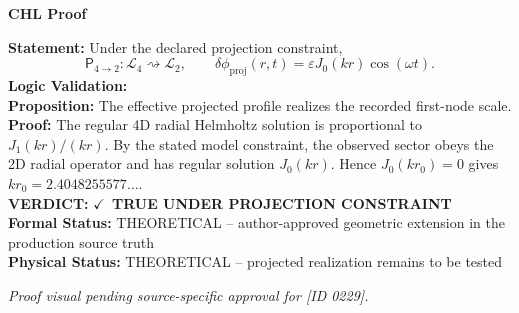 \vspace{0.45em}
\noindent\textbf{CHL Proof}\par
\textbf{Statement:} Under the declared projection constraint,
\[
\mathsf{P}_{4\to2}:\mathcal{L}_4\rightsquigarrow\mathcal{L}_2,\qquad \delta\phi_{\mathrm{proj}}(r,t)=\varepsilon J_0(k r)\cos(\omega t).
\]
\textbf{Logic Validation:}\\
\textbf{Proposition:} The effective projected profile realizes the recorded first-node scale.\\
\textbf{Proof:} The regular 4D radial Helmholtz solution is proportional to \(J_1(k r)/(k r)\). By the stated model constraint, the observed sector obeys the 2D radial operator and has regular solution \(J_0(k r)\). Hence \(J_0(k r_0)=0\) gives \(k r_0=2.4048255577\ldots\).\\
\textbf{VERDICT:} \ensuremath{\checkmark}\ \textbf{TRUE UNDER PROJECTION CONSTRAINT}\\
\textbf{Formal Status:} THEORETICAL -- author-approved geometric extension in the production source truth\\
\textbf{Physical Status:} THEORETICAL -- projected realization remains to be tested
\par\vspace{0.45em}
\par
\vfill
\begingroup\footnotesize\itshape
Proof visual pending source-specific approval for [ID 0229].
\par\endgroup
\vfill
\endgroup
\endgroup
